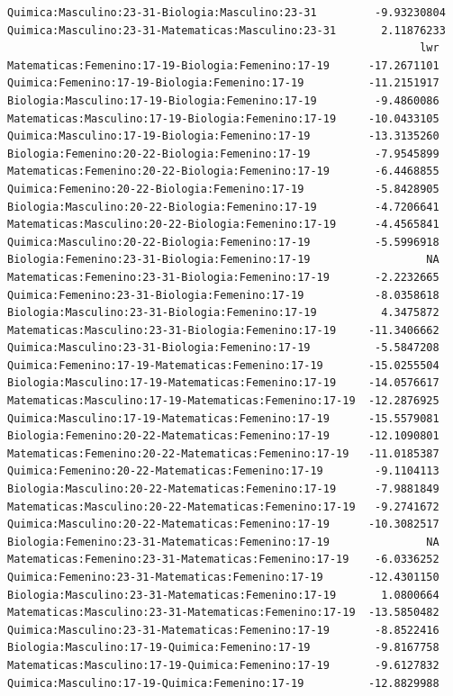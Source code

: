 \documentclass{rapport}
\begin{document}
\begin{itemize}
\begin{verbatim}
Quimica:Masculino:23-31-Biologia:Masculino:23-31         -9.93230804
Quimica:Masculino:23-31-Matematicas:Masculino:23-31       2.11876233
                                                                lwr
Matematicas:Femenino:17-19-Biologia:Femenino:17-19      -17.2671101
Quimica:Femenino:17-19-Biologia:Femenino:17-19          -11.2151917
Biologia:Masculino:17-19-Biologia:Femenino:17-19         -9.4860086
Matematicas:Masculino:17-19-Biologia:Femenino:17-19     -10.0433105
Quimica:Masculino:17-19-Biologia:Femenino:17-19         -13.3135260
Biologia:Femenino:20-22-Biologia:Femenino:17-19          -7.9545899
Matematicas:Femenino:20-22-Biologia:Femenino:17-19       -6.4468855
Quimica:Femenino:20-22-Biologia:Femenino:17-19           -5.8428905
Biologia:Masculino:20-22-Biologia:Femenino:17-19         -4.7206641
Matematicas:Masculino:20-22-Biologia:Femenino:17-19      -4.4565841
Quimica:Masculino:20-22-Biologia:Femenino:17-19          -5.5996918
Biologia:Femenino:23-31-Biologia:Femenino:17-19                  NA
Matematicas:Femenino:23-31-Biologia:Femenino:17-19       -2.2232665
Quimica:Femenino:23-31-Biologia:Femenino:17-19           -8.0358618
Biologia:Masculino:23-31-Biologia:Femenino:17-19          4.3475872
Matematicas:Masculino:23-31-Biologia:Femenino:17-19     -11.3406662
Quimica:Masculino:23-31-Biologia:Femenino:17-19          -5.5847208
Quimica:Femenino:17-19-Matematicas:Femenino:17-19       -15.0255504
Biologia:Masculino:17-19-Matematicas:Femenino:17-19     -14.0576617
Matematicas:Masculino:17-19-Matematicas:Femenino:17-19  -12.2876925
Quimica:Masculino:17-19-Matematicas:Femenino:17-19      -15.5579081
Biologia:Femenino:20-22-Matematicas:Femenino:17-19      -12.1090801
Matematicas:Femenino:20-22-Matematicas:Femenino:17-19   -11.0185387
Quimica:Femenino:20-22-Matematicas:Femenino:17-19        -9.1104113
Biologia:Masculino:20-22-Matematicas:Femenino:17-19      -7.9881849
Matematicas:Masculino:20-22-Matematicas:Femenino:17-19   -9.2741672
Quimica:Masculino:20-22-Matematicas:Femenino:17-19      -10.3082517
Biologia:Femenino:23-31-Matematicas:Femenino:17-19               NA
Matematicas:Femenino:23-31-Matematicas:Femenino:17-19    -6.0336252
Quimica:Femenino:23-31-Matematicas:Femenino:17-19       -12.4301150
Biologia:Masculino:23-31-Matematicas:Femenino:17-19       1.0800664
Matematicas:Masculino:23-31-Matematicas:Femenino:17-19  -13.5850482
Quimica:Masculino:23-31-Matematicas:Femenino:17-19       -8.8522416
Biologia:Masculino:17-19-Quimica:Femenino:17-19          -9.8167758
Matematicas:Masculino:17-19-Quimica:Femenino:17-19       -9.6127832
Quimica:Masculino:17-19-Quimica:Femenino:17-19          -12.8829988

\end{verbatim}
\end{itemize}
\end{document}

